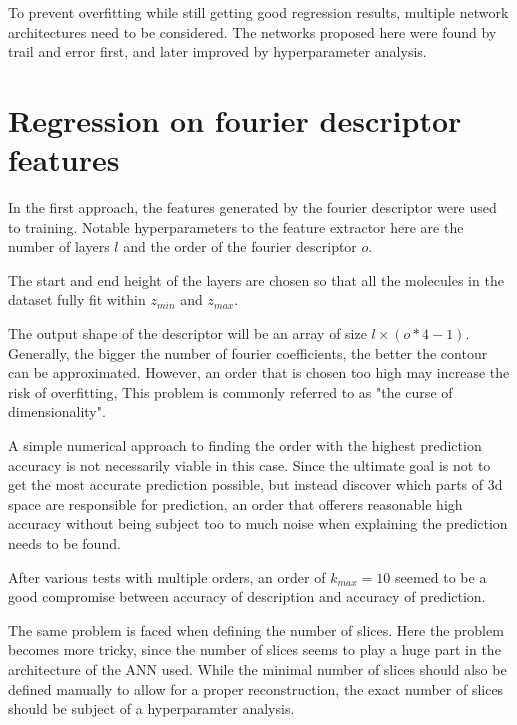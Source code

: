 To prevent overfitting while still getting good regression results, multiple network architectures need to be considered.
The networks proposed here were found by trail and error first, and later improved by hyperparameter analysis.


\section{Regression on fourier descriptor features}
\label{sec:Evaluation:fourier}

In the first approach, the features generated by the fourier descriptor were used to training.
Notable hyperparameters to the feature extractor here are the number of layers $l$ and the order of the fourier descriptor $o$.

The start and end height of the layers are chosen so that all the molecules in the dataset fully fit within $z_{min}$ and $z_{max}$.

The output shape of the descriptor will be an array of size $l \times (o * 4 - 1)$.
Generally, the bigger the number of fourier coefficients, the better the contour can be approximated.
However, an order that is chosen too high may increase the risk of overfitting, 
This problem is commonly referred to as "the curse of dimensionality".

A simple numerical approach to finding the order with the highest prediction accuracy is not necessarily viable in this case.
Since the ultimate goal is not to get the most accurate prediction possible, but instead discover which parts of 3d space 
are responsible for prediction, an order that offerers reasonable high accuracy without being subject too to much noise when explaining the 
prediction needs to be found. %

After various tests with multiple orders, an order of $k_{max} = 10$ seemed to be a good compromise between accuracy of description and accuracy of prediction.

The same problem is faced when defining the number of slices.
Here the problem becomes more tricky, since the number of slices seems to play a huge part in the architecture of the ANN used.
While the minimal number of slices should also be defined manually to allow for a proper reconstruction, the exact number of slices should be subject of a hyperparamter analysis.

